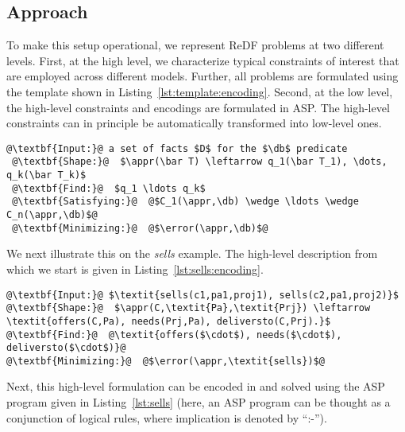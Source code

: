 \subsection{Approach}
To make this setup operational, we represent ReDF problems at two different levels. First, at the high level, we characterize typical constraints of interest that are employed across different models. Further, all problems are formulated using the template shown in Listing~\ref{lst:template:encoding}. Second, at the low level, the high-level constraints and encodings are formulated in ASP. The high-level constraints can in principle be automatically transformed into low-level ones.

\begin{lstlisting}[style=model,caption=Prototypical template of a high level problem encoding, label=lst:template:encoding]
 @\textbf{Input:}@ a set of facts $D$ for the $\db$ predicate 
 @\textbf{Shape:}@  $\appr(\bar T) \leftarrow q_1(\bar T_1), \dots, q_k(\bar T_k)$
 @\textbf{Find:}@  $q_1 \ldots q_k$
 @\textbf{Satisfying:}@  @$C_1(\appr,\db) \wedge \ldots \wedge C_n(\appr,\db)$@
 @\textbf{Minimizing:}@  @$\error(\appr,\db)$@\end{lstlisting}

We next illustrate this on the {\em sells} example. The high-level description from which we start is given in Listing~\ref{lst:sells:encoding}.

\begin{minipage}{\textwidth}  
\begin{lstlisting}[style=model,caption=Sells example encoding, label=lst:sells:encoding]
@\textbf{Input:}@ $\textit{sells(c1,pa1,proj1), sells(c2,pa1,proj2)}$ 
@\textbf{Shape:}@  $\appr(C,\textit{Pa},\textit{Prj}) \leftarrow \textit{offers(C,Pa), needs(Prj,Pa), deliversto(C,Prj).}$
@\textbf{Find:}@  @\textit{offers($\cdot$), needs($\cdot$), deliversto($\cdot$)}@
@\textbf{Minimizing:}@  @$\error(\appr,\textit{sells})$@
\end{lstlisting}
\end{minipage}

Next, this high-level formulation can be encoded in and solved using the ASP program given in Listing~\ref{lst:sells} (here, an ASP program can be thought as a conjunction of logical rules, where implication is denoted by ``:-'').


